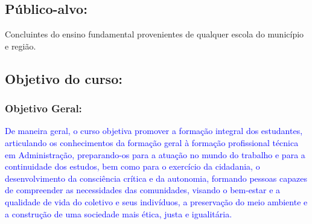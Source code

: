 \documentclass{../../modelos/latex-shared/ifsc-ppc}
\newcommand{\revisao}[1]{\textcolor{blue}{#1}}
\newcommand{\revisao}[1]{#1}
\begin{document}
\subsection{Público-alvo:}
Concluintes do ensino fundamental provenientes de qualquer escola do município e região.

\subsection{Objetivo do curso:}
\subsubsection{Objetivo Geral:}
\revisao{De maneira geral, o curso objetiva promover a formação integral dos estudantes, articulando os conhecimentos da formação geral à formação profissional técnica em Administração, preparando-os para a atuação no mundo do trabalho e para a continuidade dos estudos, bem como para o exercício da cidadania, o desenvolvimento da consciência crítica e da autonomia, formando pessoas capazes de compreender as necessidades das comunidades, visando o bem-estar e a qualidade de vida do coletivo e seus indivíduos, a preservação do meio ambiente e a construção de uma sociedade mais ética, justa e igualitária.}
\end{document}
